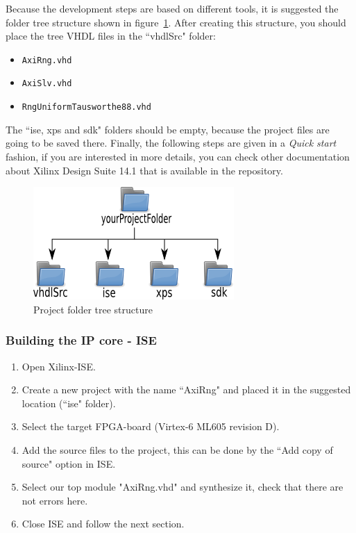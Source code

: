 Because the development steps are based on different tools, it is suggested the folder tree structure shown in figure~\ref{f5}. After creating this structure, you should place the tree VHDL files in the ``vhdlSrc" folder:

\begin{itemize}
\item {\tt AxiRng.vhd}
\item {\tt AxiSlv.vhd} 
\item {\tt RngUniformTausworthe88.vhd}
\end{itemize}

The ``ise, xps and sdk" folders should be empty, because the project files are going to be saved there. Finally, the following steps are given in a {\it Quick start} fashion, if you are interested in more details, you can check other documentation about Xilinx Design Suite 14.1 that is available in the repository.

\begin{figure}[!h]
\includegraphics[scale=0.60]{images/folderTreeStructure.png}
\caption{Project folder tree structure}
\label{f5}
\end{figure}

\subsubsection{Building the IP core - ISE}
\begin{enumerate}
\item Open Xilinx-ISE.
\item Create a new project with the name ``AxiRng" and placed it in the suggested location (``ise" folder).
\item Select the target FPGA-board (Virtex-6 ML605 revision D).
\item Add the source files to the project, this can be done by the ``Add copy of source" option in ISE.
\item Select our top module "AxiRng.vhd" and synthesize it, check that there are not errors here.
\item Close ISE and follow the next section.
\end{enumerate}

